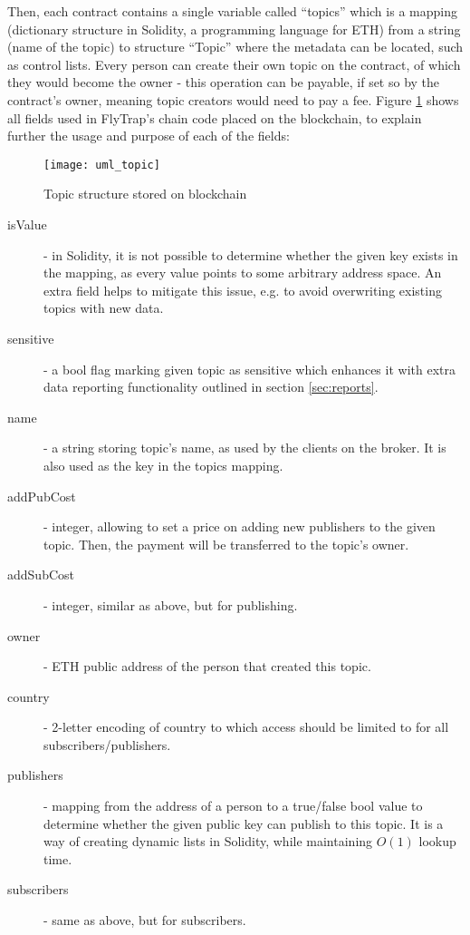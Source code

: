 Then, each contract contains a single variable called ``topics'' which is a mapping (dictionary structure in Solidity, a programming language for ETH) from a string (name of the topic) to structure ``Topic'' where the metadata can be located, such as control lists. Every person can create their own topic on the contract, of which they would become the owner - this operation can be payable, if set so by the contract's owner, meaning topic creators would need to pay a fee. Figure \ref{fig:uml_topic} shows all fields used in FlyTrap's chain code placed on the blockchain, to explain further the usage and purpose of each of the fields:
\begin{figure}[h]
    \centering
    \texttt{[image: uml\_topic]}
    \caption{Topic structure stored on blockchain}
    \label{fig:uml_topic}
\end{figure}
\begin{description}
    \item[isValue] - in Solidity, it is not possible to determine whether the given key exists in the mapping, as every value points to some arbitrary address space. An extra field helps to mitigate this issue, e.g. to avoid overwriting existing topics with new data.
    \item[sensitive] - a bool flag marking given topic as sensitive which enhances it with extra data reporting functionality outlined in section \ref{sec:reports}.
    \item[name] - a string storing topic's name, as used by the clients on the broker. It is also used as the key in the topics mapping.
    \item[addPubCost] - integer, allowing to set a price on adding new publishers to the given topic. Then, the payment will be transferred to the topic's owner.
    \item[addSubCost] - integer, similar as above, but for publishing.
    \item[owner] - ETH public address of the person that created this topic.
    \item[country] - 2-letter encoding of country to which access should be limited to for all subscribers/publishers.
    \item[publishers] - mapping from the address of a person to a true/false bool value to determine whether the given public key can publish to this topic. It is a way of creating dynamic lists in Solidity, while maintaining $O(1)$ lookup time.
    \item[subscribers] - same as above, but for subscribers.
\end{description}

